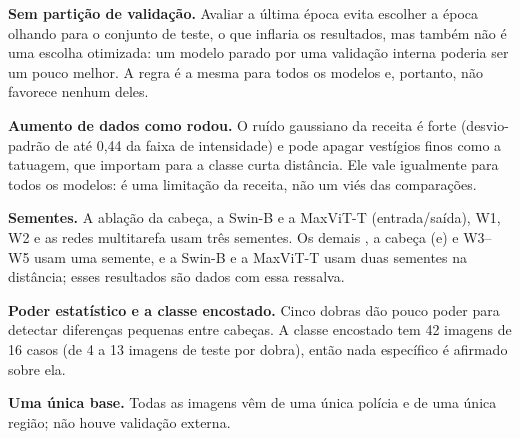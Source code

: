 \textbf{Sem partição de validação.} Avaliar a última época evita escolher a época olhando para o conjunto de teste, o que inflaria os resultados, mas também não é uma escolha otimizada: um modelo parado por uma validação interna poderia ser um pouco melhor. A regra é a mesma para todos os modelos e, portanto, não favorece nenhum deles.

\textbf{Aumento de dados como rodou.} O ruído gaussiano da receita é forte (desvio-padrão de até 0,44 da faixa de intensidade) e pode apagar vestígios finos como a tatuagem, que importam para a classe curta distância. Ele vale igualmente para todos os modelos: é uma limitação da receita, não um viés das comparações.

\textbf{Sementes.} A ablação da cabeça, a Swin-B e a MaxViT-T (entrada/saída), W1, W2 e as redes multitarefa usam três sementes. Os demais , a cabeça (e) e W3--W5 usam uma semente, e a Swin-B e a MaxViT-T usam duas sementes na distância; esses resultados são dados com essa ressalva.

\textbf{Poder estatístico e a classe encostado.} Cinco dobras dão pouco poder para detectar diferenças pequenas entre cabeças. A classe encostado tem 42 imagens de 16 casos (de 4 a 13 imagens de teste por dobra), então nada específico é afirmado sobre ela.

\textbf{Uma única base.} Todas as imagens vêm de uma única polícia e de uma única região; não houve validação externa.
